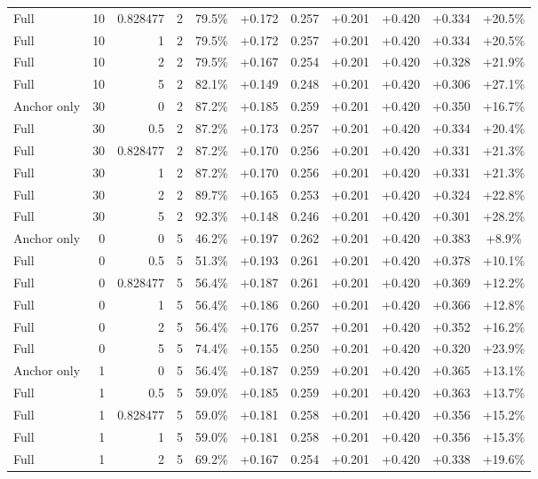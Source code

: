 \begin{table}[htbp]
\begin{tabular}{lrrrccccccc}
Full & 10 & 0.828477 & 2 & 79.5\% & +0.172 & 0.257 & +0.201 & +0.420 & +0.334 & +20.5\% \\
Full & 10 & 1 & 2 & 79.5\% & +0.172 & 0.257 & +0.201 & +0.420 & +0.334 & +20.5\% \\
Full & 10 & 2 & 2 & 79.5\% & +0.167 & 0.254 & +0.201 & +0.420 & +0.328 & +21.9\% \\
Full & 10 & 5 & 2 & 82.1\% & +0.149 & 0.248 & +0.201 & +0.420 & +0.306 & +27.1\% \\
Anchor only & 30 & 0 & 2 & 87.2\% & +0.185 & 0.259 & +0.201 & +0.420 & +0.350 & +16.7\% \\
Full & 30 & 0.5 & 2 & 87.2\% & +0.173 & 0.257 & +0.201 & +0.420 & +0.334 & +20.4\% \\
Full & 30 & 0.828477 & 2 & 87.2\% & +0.170 & 0.256 & +0.201 & +0.420 & +0.331 & +21.3\% \\
Full & 30 & 1 & 2 & 87.2\% & +0.170 & 0.256 & +0.201 & +0.420 & +0.331 & +21.3\% \\
Full & 30 & 2 & 2 & 89.7\% & +0.165 & 0.253 & +0.201 & +0.420 & +0.324 & +22.8\% \\
Full & 30 & 5 & 2 & 92.3\% & +0.148 & 0.246 & +0.201 & +0.420 & +0.301 & +28.2\% \\
Anchor only & 0 & 0 & 5 & 46.2\% & +0.197 & 0.262 & +0.201 & +0.420 & +0.383 & +8.9\% \\
Full & 0 & 0.5 & 5 & 51.3\% & +0.193 & 0.261 & +0.201 & +0.420 & +0.378 & +10.1\% \\
Full & 0 & 0.828477 & 5 & 56.4\% & +0.187 & 0.261 & +0.201 & +0.420 & +0.369 & +12.2\% \\
Full & 0 & 1 & 5 & 56.4\% & +0.186 & 0.260 & +0.201 & +0.420 & +0.366 & +12.8\% \\
Full & 0 & 2 & 5 & 56.4\% & +0.176 & 0.257 & +0.201 & +0.420 & +0.352 & +16.2\% \\
Full & 0 & 5 & 5 & 74.4\% & +0.155 & 0.250 & +0.201 & +0.420 & +0.320 & +23.9\% \\
Anchor only & 1 & 0 & 5 & 56.4\% & +0.187 & 0.259 & +0.201 & +0.420 & +0.365 & +13.1\% \\
Full & 1 & 0.5 & 5 & 59.0\% & +0.185 & 0.259 & +0.201 & +0.420 & +0.363 & +13.7\% \\
Full & 1 & 0.828477 & 5 & 59.0\% & +0.181 & 0.258 & +0.201 & +0.420 & +0.356 & +15.2\% \\
Full & 1 & 1 & 5 & 59.0\% & +0.181 & 0.258 & +0.201 & +0.420 & +0.356 & +15.3\% \\
Full & 1 & 2 & 5 & 69.2\% & +0.167 & 0.254 & +0.201 & +0.420 & +0.338 & +19.6\% \\

\end{tabular}
\end{table}

